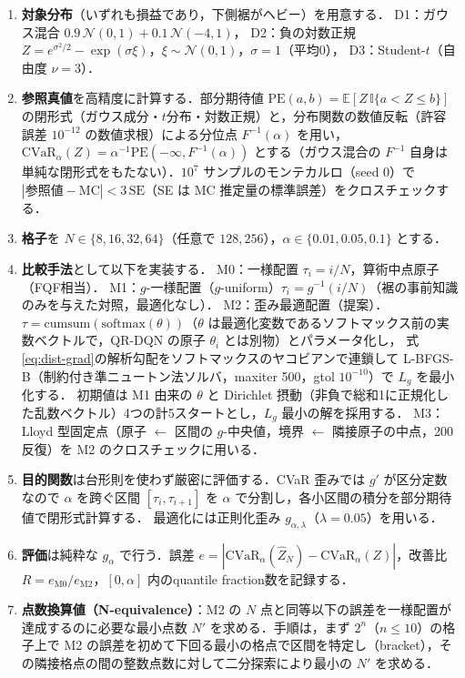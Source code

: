 \documentclass[a4paper,10pt]{jsarticle}
\theoremstyle{definition}
\newcommand{\CVaR}{\mathrm{CVaR}}
\newcommand{\Finv}{F^{-1}}
\newcommand{\E}{\mathbb{E}}
\begin{document}
\begin{enumerate}
  \item \textbf{対象分布}（いずれも損益であり，下側裾がヘビー）を用意する．
  D1：ガウス混合 $0.9\,\mathcal N(0,1)+0.1\,\mathcal N(-4,1)$，
  D2：負の対数正規 $Z=e^{\sigma^2/2}-\exp(\sigma\xi)$，$\xi\sim\mathcal N(0,1)$，$\sigma=1$（平均0），
  D3：Student-$t$（自由度 $\nu=3$）．
  \item \textbf{参照真値}を高精度に計算する．部分期待値 $\mathrm{PE}(a,b)=\E[Z\,\mathbb{I}\{a<Z\le b\}]$ の閉形式（ガウス成分・$t$分布・対数正規）と，分布関数の数値反転（許容誤差 $10^{-12}$ の数値求根）による分位点 $\Finv(\alpha)$ を用い，
  $\CVaR_\alpha(Z)=\alpha^{-1}\mathrm{PE}(-\infty,\Finv(\alpha))$ とする（ガウス混合の $\Finv$ 自身は単純な閉形式をもたない）．$10^7$ サンプルのモンテカルロ（seed 0）で $|\text{参照値}-\text{MC}|<3\,\mathrm{SE}$（SE は MC 推定量の標準誤差）をクロスチェックする．
  \item \textbf{格子}を $N\in\{8,16,32,64\}$（任意で $128,256$），$\alpha\in\{0.01,0.05,0.1\}$ とする．
  \item \textbf{比較手法}として以下を実装する．
  M0：一様配置 $\tau_i=i/N$，算術中点原子（FQF相当）．
  M1：$g$-一様配置（$g$-uniform）$\tau_i=g^{-1}(i/N)$（裾の事前知識のみを与えた対照，最適化なし）．
  M2：歪み最適配置（提案）．$\tau=\mathrm{cumsum}(\mathrm{softmax}(\theta))$（$\theta$ は最適化変数であるソフトマックス前の実数ベクトルで，QR-DQN の原子 $\theta_i$ とは別物）とパラメータ化し，
  式\eqref{eq:dist-grad}の解析勾配をソフトマックスのヤコビアンで連鎖して L-BFGS-B（制約付き準ニュートン法ソルバ，maxiter 500，gtol $10^{-10}$）で $L_g$ を最小化する．
  初期値は M1 由来の $\theta$ と Dirichlet 摂動（非負で総和1に正規化した乱数ベクトル）4つの計5スタートとし，$L_g$ 最小の解を採用する．
  M3：Lloyd 型固定点（原子 $\leftarrow$ 区間の $g$-中央値，境界 $\leftarrow$ 隣接原子の中点，200反復）を M2 のクロスチェックに用いる．
  \item \textbf{目的関数}は台形則を使わず厳密に評価する．CVaR 歪みでは $g'$ が区分定数なので $\alpha$ を跨ぐ区間 $[\tau_i,\tau_{i+1}]$ を $\alpha$ で分割し，各小区間の積分を部分期待値で閉形式計算する．
  最適化には正則化歪み $g_{\alpha,\lambda}$（$\lambda=0.05$）を用いる．
  \item \textbf{評価}は純粋な $g_\alpha$ で行う．誤差 $e=|\CVaR_\alpha(\hat Z_N)-\CVaR_\alpha(Z)|$，改善比 $R=e_{\mathrm{M0}}/e_{\mathrm{M2}}$，$[0,\alpha]$ 内のquantile fraction数を記録する．
  \item \textbf{点数換算値（N-equivalence）}：M2 の $N$ 点と同等以下の誤差を一様配置が達成するのに必要な最小点数 $N'$ を求める．手順は，まず $2^n$（$n\le10$）の格子上で M2 の誤差を初めて下回る最小の格点で区間を特定し（bracket），その隣接格点の間の整数点数に対して二分探索により最小の $N'$ を求める．

\end{enumerate}
\end{document}
